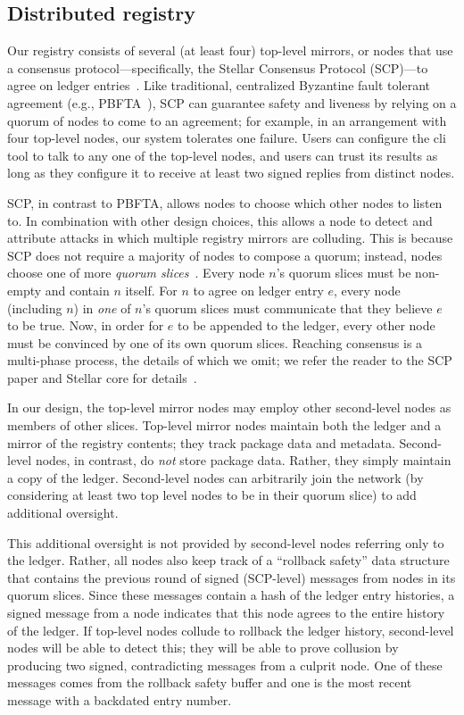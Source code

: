 \subsection{Distributed registry}
Our registry consists of several (at least four) top-level mirrors, or nodes
that use a consensus protocol---specifically, the Stellar Consensus
Protocol (SCP)---to agree on ledger entries~\cite{stellar}.
Like traditional, centralized Byzantine fault tolerant
agreement (e.g., PBFTA~\cite{pbfts}), SCP can guarantee safety and liveness by
relying on a quorum of nodes to come to an agreement; for example, in an
arrangement with four top-level nodes, our system tolerates one failure.
Users can configure the \spam{} cli tool to talk to any one of the top-level
nodes, and users can trust its results as long as they configure it
to receive at least two signed replies from distinct nodes.

SCP, in contrast to PBFTA, allows nodes to choose which other nodes to listen to. 
In combination with other design choices, this allows a node to detect and
attribute attacks in which multiple registry mirrors are colluding.
This is because SCP does not require a majority of nodes to compose a quorum;
instead, nodes choose one of more \emph{quorum slices}~\cite{stellar}.
Every node $n$'s quorum slices must be non-empty and contain $n$ itself.
For $n$ to agree on ledger entry $e$, every node (including $n$) in \emph{one} of
$n$'s quorum slices must communicate that they believe $e$ to be
true. Now, in order for $e$ to be appended to the
ledger, every other node must be convinced by one of its own quorum slices.
Reaching consensus is a multi-phase process, the details of which we omit;
we refer the reader to the SCP paper and Stellar core for details~\cite{stellar,core}.

In our design, the top-level mirror nodes may employ other
second-level nodes as members of other slices. Top-level mirror nodes maintain both
the ledger and a mirror of the registry contents; they track package data and metadata. 
Second-level nodes, in contrast, do \emph{not} store package data.
Rather, they simply maintain a copy of the ledger. Second-level nodes can arbitrarily
join the network (by considering at least two top level nodes to be in their
quorum slice) to add additional oversight.

This additional oversight is not provided by second-level nodes referring
only to the ledger. Rather, all nodes also keep track of a ``rollback safety''
data structure that contains the previous round of signed (SCP-level) messages from nodes in its quorum
slices. Since these messages contain a hash of the ledger entry histories, a signed
message from a node indicates that this node agrees to the entire history of the
ledger. If top-level nodes collude to rollback the ledger history, second-level nodes
will be able to detect this; they will be able to prove collusion by producing
two signed, contradicting messages from a culprit node. One of these messages
comes from the rollback safety buffer and one is the most recent message with
a backdated entry number. 

